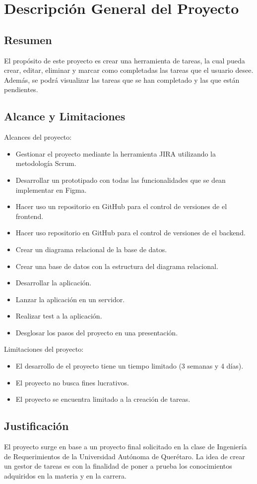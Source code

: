 \chapter{Descripción General del Proyecto}
\section{Resumen}
El propósito de este proyecto es crear una herramienta de tareas, la cual pueda crear, editar, eliminar y marcar como completadas
las tareas que el usuario desee. Además, se podrá visualizar las tareas que se han completado y las que están pendientes.

\section{Alcance y Limitaciones}
Alcances del proyecto:
\begin{itemize}
  \item Gestionar el proyecto mediante la herramienta JIRA utilizando la metodología Scrum.
  \item Desarrollar un prototipado con todas las funcionalidades que se dean implementar en Figma.
  \item Hacer uso un repositorio en GitHub para el control de versiones de el frontend.
  \item Hacer uso repositorio en GitHub para el control de versiones de el backend.
  \item Crear un diagrama relacional de la base de datos.
  \item Crear una base de datos con la estructura del diagrama relacional.
  \item Desarrollar la aplicación.
  \item Lanzar la aplicación en un servidor.
  \item Realizar test a la aplicación.
  \item Desglosar los pasos del proyecto en una presentación.
\end{itemize}

Limitaciones del proyecto:
\begin{itemize}
  \item El desarrollo de el proyecto tiene un tiempo limitado (3 semanas y 4 días).
  \item El proyecto no busca fines lucrativos.
  \item El proyecto se encuentra limitado a la creación de tareas.
\end{itemize}


\section{Justificación}
El proyecto surge en base a un proyecto final solicitado en la clase de Ingeniería de Requerimientos
de la Universidad Autónoma de Querétaro. La idea de crear un gestor de tareas es con la finalidad de poner 
a prueba los conocimientos adquiridos en la materia y en la carrera.
